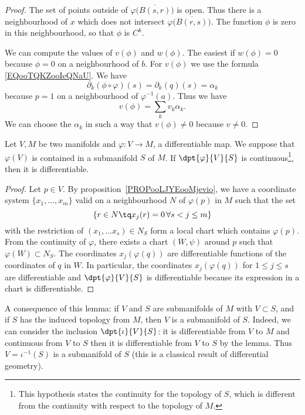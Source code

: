 \begin{proof}
    The set of points outside of \( \varphi\big( \overline{ B(s,r) } \big)\) is open. Thus there is a neighbourhood of \( x\) which does not intersect \( \varphi\big( \overline{ B(r,s) } \big)\). The function \( \phi\) is zero in this neighbourhood, so that \( \phi\) is \(  C^k\).

    We can compute the values of \( v(\phi)\) and \( w(\phi)\). The easiest if \( w(\phi)=0\) because \( \phi=0\) on a neighbourhood of \( b\). For \( v(\phi)\) we use the formula \ref{EQooTQKZooIeQNaU}. We have
    \begin{equation}
        \partial_k(\phi\circ\varphi)(s)=\partial_k(q)(s)=\alpha_k
    \end{equation}
    because \( p=1\) on a neighbourhood of \( \varphi^{-1}(a)\). Thus we have
    \begin{equation}
        v(\phi)=\sum_kv_k\alpha_k.
    \end{equation}
    We can choose the \( \alpha_k\) in such a way that \( v(\phi)\neq 0\) because \( v\neq 0\).
\end{proof}

\begin{lemma}\label{lem:var_cont_diff}
    Let $V,M$ be two manifolds and $\varphi\colon V\to M$, a differentiable map. We suppose that $\varphi(V)$ is contained in a submanifold $S$ of $M$. If $\dpt{\varphi}{V}{S}$ is continuous\footnote{This hypothesis states the continuity for the topology of \( S\), which is different from the continuity with respect to the topology of \( M\).}, then it is differentiable.
\end{lemma}

\begin{proof}
Let $p\in V$. By proposition~\ref{PROPooLJYEooMjevio}, we have  a coordinate system $\{x_1,\ldots,x_m\}$ valid on a neighbourhood $N$ of $\varphi(p)$ in $M$ such that the set
\[
  \{r\in N\tq x_j(r)=0\, \forall s<j\leq m  \}
\]
with the restriction of $(x_1,\ldots x_s)\in N_S$ form a local chart which contains $\varphi(p)$. From the continuity of $\varphi$, there exists a chart $(W,\psi)$ around $p$ such that $\varphi(W)\subset N_S$. The coordinates $x_j(\varphi(q))$ are differentiable functions of  the coordinates of $q$ in $W$. In particular, the coordinates $x_j(\varphi(q))$ for $1\leq j\leq s$ are differentiable and $\dpt{\varphi}{V}{S}$ is differentiable because its expression in a chart is differentiable.
\end{proof}

A consequence of this lemma: if $V$ and $S$ are submanifolds of $M$ with $V\subset S$, and if $S$ has the induced topology from $M$, then $V$ is a submanifold of $S$. Indeed, we can consider the inclusion $\dpt{\iota}{V}{S}$: it is differentiable from $V$ to $M$ and continuous from $V$ to $S$ then it is differentiable from $V$ to $S$ by the lemma. Thus $V=\iota^{-1}(S)$ is a submanifold of $S$ (this is a classical result of differential geometry).


